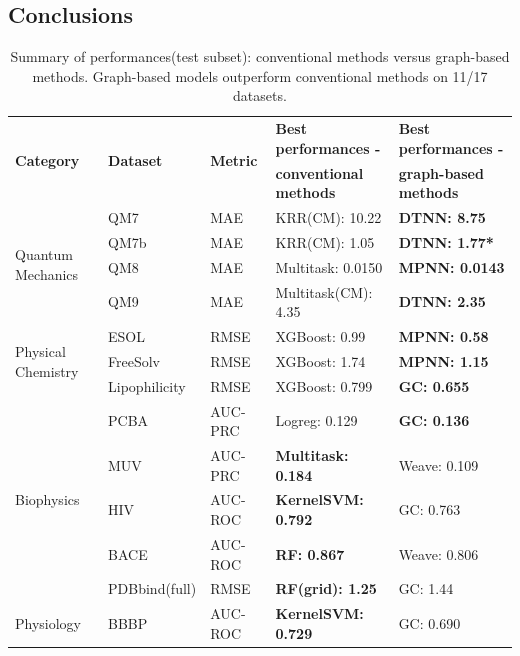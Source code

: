 \subsection{Conclusions}

\begin{table}[htbp]
    \caption{Summary of performances(test subset): conventional methods versus graph-based methods. Graph-based models outperform conventional methods on 11/17 datasets.}
    \centering
    \label{tab:conventional_versus_graph}
    \begin{threeparttable}[b]
    \begin{tabular*}{\textwidth}{@{\extracolsep{\fill}}lllll}
    \hline
    \multirow{2}{*}{\textbf{Category}} & \multirow{2}{*}{\textbf{Dataset}} & \multirow{2}{*}{\textbf{Metric}} & \textbf{Best performances - } & \textbf{Best performances - }\\
    & & & \textbf{conventional methods} & \textbf{graph-based methods} \\
    \hline
    \multirow{4}{*}{Quantum Mechanics} & QM7 & MAE & KRR(CM): 10.22 & \textbf{DTNN: 8.75} \\\cline{2-5}
    & QM7b & MAE & KRR(CM): 1.05 & \textbf{DTNN: 1.77*} \\\cline{2-5}
    & QM8 & MAE & Multitask: 0.0150 & \textbf{MPNN: 0.0143} \\\cline{2-5}
    & QM9 & MAE & Multitask(CM): 4.35 & \textbf{DTNN: 2.35} \\\cline{2-5}
    \hline
    \multirow{3}{*}{Physical Chemistry} & ESOL & RMSE & XGBoost: 0.99 & \textbf{MPNN: 0.58} \\\cline{2-5}
    & FreeSolv & RMSE & XGBoost: 1.74 & \textbf{MPNN: 1.15} \\\cline{2-5}
    & Lipophilicity & RMSE & XGBoost: 0.799 & \textbf{GC: 0.655} \\
    \hline
    \multirow{5}{*}{Biophysics} & PCBA & AUC-PRC & Logreg: 0.129 & \textbf{GC: 0.136} \\\cline{2-5}
    & MUV & AUC-PRC & \textbf{Multitask: 0.184} & Weave: 0.109 \\\cline{2-5}
    & HIV & AUC-ROC & \textbf{KernelSVM: 0.792} & GC: 0.763 \\\cline{2-5}
    & BACE & AUC-ROC & \textbf{RF: 0.867} & Weave: 0.806 \\\cline{2-5}
    & PDBbind(full) & RMSE & \textbf{RF(grid): 1.25} & GC: 1.44 \\
    \hline
    \multirow{5}{*}{Physiology} & BBBP & AUC-ROC & \textbf{KernelSVM: 0.729} & GC: 0.690 \\\cline{2-5}

\end{tabular*}
\end{threeparttable}
\end{table}
